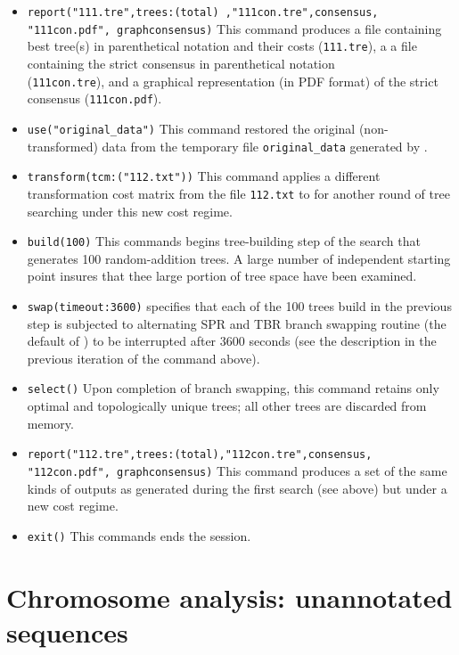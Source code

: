 \begin{itemize}
\item \texttt{report("111.tre",trees:(total) ,"111con.tre",consensus,\\"111con.pdf", graphconsensus)} This command 
produces a file containing best tree(s) in parenthetical notation and their costs (\texttt{111.tre}), a a file containing the 
strict consensus in parenthetical notation \\(\texttt{111con.tre}), and a graphical representation (in PDF format) of the 
strict consensus (\texttt{111con.pdf}).
\item \texttt{use("original\_data")} This command restored the original (non-trans\-formed) data from the temporary file 
\texttt{original\_data} generated by .
\item \texttt{transform(tcm:("112.txt"))} This command applies a different transformation cost matrix from the file 
\texttt{112.txt} to for another round of tree searching under this new cost regime.
\item \texttt{build(100)} This commands begins tree-building step of the search that generates 100 random-addition 
trees. A large number of independent starting point insures that thee large portion of tree space have been 
examined.
\item \texttt{swap(timeout:3600)}  specifies that each of the 100 trees build in the previous step is 
subjected to alternating SPR and TBR branch swapping routine (the default of \poy) to be interrupted after 3600 
seconds (see the description in the previous iteration of the command above).
\item \texttt{select()} Upon completion of branch swapping, this command retains only optimal and topologically 
unique trees; all other trees are discarded from memory.
\item \texttt{report("112.tre",trees:(total),"112con.tre",consensus,\\"112con.pdf", graphconsensus)} This command 
produces a set of the same kinds of outputs as generated during the first search (see above) but under a new cost 
regime.
\item \texttt{exit()} This commands ends the \poy session.
\end{itemize}

\section{Chromosome analysis: unannotated sequences}{\label{tutorial 6}}

